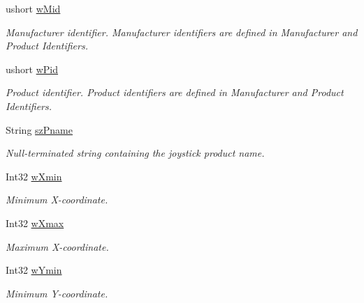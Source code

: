 \begin{DoxyCompactItemize}
\item 
ushort \hyperlink{struct_tao_1_1_platform_1_1_windows_1_1_winmm_1_1_j_o_y_c_a_p_s_a13f17a3bcf6af2493d34aa0b9b469dd0}{wMid}
\begin{DoxyCompactList}\small\item\em Manufacturer identifier. Manufacturer identifiers are defined in Manufacturer and Product Identifiers. \item\end{DoxyCompactList}\item 
ushort \hyperlink{struct_tao_1_1_platform_1_1_windows_1_1_winmm_1_1_j_o_y_c_a_p_s_a8f7cd6ba40eb7523b4300c6996530485}{wPid}
\begin{DoxyCompactList}\small\item\em Product identifier. Product identifiers are defined in Manufacturer and Product Identifiers. \item\end{DoxyCompactList}\item 
String \hyperlink{struct_tao_1_1_platform_1_1_windows_1_1_winmm_1_1_j_o_y_c_a_p_s_a2c343e427e5772c38281c91e93f7898e}{szPname}
\begin{DoxyCompactList}\small\item\em Null-\/terminated string containing the joystick product name. \item\end{DoxyCompactList}\item 
Int32 \hyperlink{struct_tao_1_1_platform_1_1_windows_1_1_winmm_1_1_j_o_y_c_a_p_s_aadb1241381b0471dbe792fe06e4df58c}{wXmin}
\begin{DoxyCompactList}\small\item\em Minimum X-\/coordinate. \item\end{DoxyCompactList}\item 
Int32 \hyperlink{struct_tao_1_1_platform_1_1_windows_1_1_winmm_1_1_j_o_y_c_a_p_s_aec291d2a403c99427715c896cc115e5c}{wXmax}
\begin{DoxyCompactList}\small\item\em Maximum X-\/coordinate. \item\end{DoxyCompactList}\item 
Int32 \hyperlink{struct_tao_1_1_platform_1_1_windows_1_1_winmm_1_1_j_o_y_c_a_p_s_a88fc091348eab2c1f4c6a95dc67f816a}{wYmin}
\begin{DoxyCompactList}\small\item\em Minimum Y-\/coordinate. \item\end{DoxyCompactList}\item 

\end{DoxyCompactItemize}
